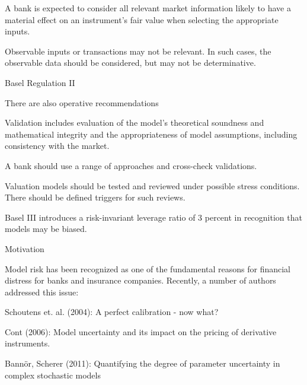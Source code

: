 	A bank is expected to consider all relevant market information likely to have a material effect on an instrument's fair value when selecting the appropriate inputs.


	Observable inputs or transactions may not be relevant. In such cases, the observable data should be considered, but   may not be determinative.





{Basel Regulation II}







	There are also operative recommendations






	Validation includes evaluation of the model's theoretical soundness and mathematical integrity and the appropriateness of model assumptions, including consistency with the market.


	A bank should use a range of approaches and cross-check validations.


	Valuation models should be tested and reviewed under possible stress conditions. There should be defined triggers for such reviews.







	
Basel III introduces a risk-invariant leverage ratio of 3 percent in recognition that models may be biased.






{Motivation}






	Model risk has been recognized as one of the fundamental reasons for financial distress for banks and insurance companies.
Recently, a number of authors addressed this issue:






	Schoutens et. al. (2004): A perfect calibration - now what?


	Cont (2006): Model uncertainty and its impact on the pricing of derivative instruments.


	Bann{\"o}r, Scherer (2011): Quantifying the degree of parameter uncertainty in complex stochastic models


